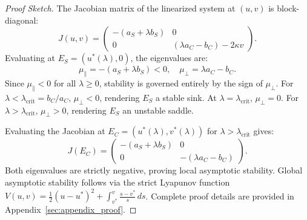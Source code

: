 \documentclass{article}
\theoremstyle{plain}
\theoremstyle{definition}
\begin{document}
\begin{proof}[Proof Sketch]
The Jacobian matrix of the linearized system at $(u, v)$ is block-diagonal:
\begin{equation}
    J(u, v) = \begin{pmatrix}
        -(a_S + \lambda b_S) & 0 \\
        0 & (\lambda a_C - b_C) - 2\kappa v
    \end{pmatrix}.
    \label{eq:jacobian}
\end{equation}
Evaluating at $E_S = (u^*(\lambda), 0)$, the eigenvalues are:
\begin{equation}
    \mu_{\parallel} = -(a_S + \lambda b_S) < 0, \quad \mu_{\perp} = \lambda a_C - b_C.
    \label{eq:eigenvalues_ES}
\end{equation}
Since $\mu_{\parallel} < 0$ for all $\lambda \ge 0$, stability is governed entirely by the sign of $\mu_{\perp}$. For $\lambda < \lambda_{\text{crit}} = b_C / a_C$, $\mu_{\perp} < 0$, rendering $E_S$ a stable sink. At $\lambda = \lambda_{\text{crit}}$, $\mu_{\perp} = 0$. For $\lambda > \lambda_{\text{crit}}$, $\mu_{\perp} > 0$, rendering $E_S$ an unstable saddle.

Evaluating the Jacobian at $E_C = (u^*(\lambda), v^*(\lambda))$ for $\lambda > \lambda_{\text{crit}}$ gives:
\begin{equation}
    J(E_C) = \begin{pmatrix}
        -(a_S + \lambda b_S) & 0 \\
        0 & -(\lambda a_C - b_C)
    \end{pmatrix}.
    \label{eq:jacobian_EC}
\end{equation}
Both eigenvalues are strictly negative, proving local asymptotic stability. Global asymptotic stability follows via the strict Lyapunov function $V(u, v) = \frac{1}{2}(u - u^*)^2 + \int_{v^*}^v \frac{s - v^*}{s} \, ds$. Complete proof details are provided in Appendix~\ref{sec:appendix_proof}.
\end{proof}
\end{document}
